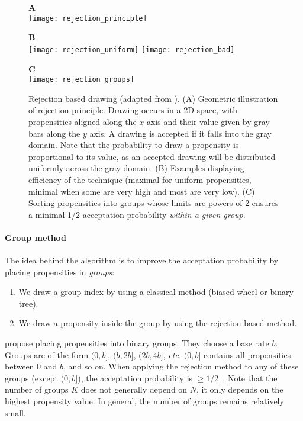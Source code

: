 \begin{figure}[!h]
  \centering
  \begin{minipage}{0.59\textwidth}
    \textbf{A} \\
    \texttt{[image: rejection\_principle]}
  \end{minipage}
  \begin{minipage}{0.39\textwidth}
    \textbf{B} \\
    \texttt{[image: rejection\_uniform]}
    \texttt{[image: rejection\_bad]}
  \end{minipage}
  \begin{minipage}{0.6\textwidth}
    \textbf{C}\\
    \texttt{[image: rejection\_groups]}
  \end{minipage}
  \caption{Rejection based drawing (adapted from \citet{slepoy_constant-time_2008}).
  (A) Geometric illustration of rejection principle.
  Drawing occurs in a 2D space, with propensities aligned along the $x$ axis
  and their value given by gray bars along the $y$ axis.
  A drawing is accepted if it falls into the gray domain.
  Note that the probability to draw a propensity is proportional to its value,
  as an accepted drawing will be distributed uniformly across the gray domain.
  (B) Examples displaying efficiency of the technique (maximal for uniform propensities,
  minimal when some are very high and most are very low).
  (C) Sorting propensities into groups whose limits are powers of 2 ensures
  a minimal 1/2 acceptation probability \emph{within a given group}.}
\label{fig:rejection_based_drawing}
\end{figure}

\paragraph{Group method}
The idea behind the algorithm is to improve the acceptation probability by placing propensities in \emph{groups}:
\begin{enumerate}
\item We draw a group index by using a classical method (biased wheel or binary tree).
\item We draw a propensity inside the group by using the rejection-based method.
\end{enumerate}

\citet{slepoy_constant-time_2008} propose placing propensities into binary groups.
They choose a base rate $b$.
Groups are of the form $(0, b]$, $(b, 2b]$, $(2b, 4b]$, \textit{etc.}
$(0,b]$ contains all propensities between 0 and $b$, and so on.
When applying the rejection method to any of these groups (except $(0, b]$),
the acceptation probability is $\geq 1/2$~.
Note that the number of groups $K$ does not generally depend on $N$,
it only depends on the highest propensity value.
In general, the number of groups remains relatively small.

